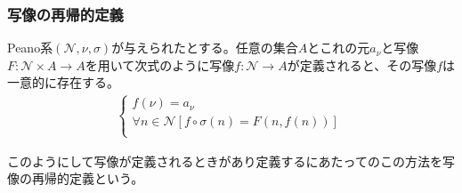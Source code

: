 \documentclass[dvipdfmx]{jsarticle}
\begin{document}
\subsubsection{写像の再帰的定義}%
\begin{thm}[写像の再帰的定義]\label{1.2.4.9}
Peano系$\left( \mathcal{N,}\nu,\sigma \right)$が与えられたとする。任意の集合$A$とこれの元$a_{\nu}$と写像$F:\mathcal{N \times}A \rightarrow A$を用いて次式のように写像$f:\mathcal{N \rightarrow}A$が定義されると、その写像$f$は一意的に存在する。
\begin{align*}
\left\{ \begin{matrix}
f(\nu) = a_{\nu} \\
\forall n \in \mathcal{N}\left[ f \circ \sigma(n) = F\left( n,f(n) \right) \right] \\
\end{matrix} \right.\ 
\end{align*}
\end{thm}
このようにして写像が定義されるときがあり定義するにあたってのこの方法を写像の再帰的定義という。
\end{document}
